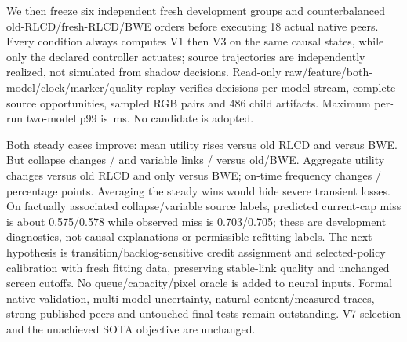 \documentclass[10pt]{article}
\begin{document}
We then freeze six independent fresh development groups and counterbalanced old-RLCD/fresh-RLCD/BWE orders before executing 18 actual native peers. Every condition always computes V1 then V3 on the same causal states, while only the declared controller actuates; source trajectories are independently realized, not simulated from shadow decisions. Read-only raw/feature/both-model/clock/marker/quality replay verifies \NativeMixedDecisions{} decisions per model stream, \NativeMixedRequests{} complete source opportunities, \NativeMixedPairs{} sampled RGB pairs and 486 child artifacts. Maximum per-run two-model p99 is \NativeMixedPolicyTail{}\,ms. No candidate is adopted.
\begin{table}[ht]
\centering

\caption{Fresh mixed-native single-model development means over six matched source/schedule groups, with common V1-then-V3 shadow compute. Generated content, same-host userspace transport and native GCC remain shared limitations; this is not promotion or representative SOTA evidence.}
\label{tab:native-mixed-v3}
\end{table}
\begin{table}[ht]
\centering\resizebox{\textwidth}{!}{}
\caption{All template-family gains and losses of fresh mixed-data RLCD. Each family has two actual source groups; positive/negative values favor/harm the candidate. Descriptive paired means, not confidence intervals or independent-model replication.}
\label{tab:native-mixed-v3-groups}
\end{table}
Both steady cases improve: mean utility rises \NativeMixedStableOldUtilityDelta{} versus old RLCD and \NativeMixedStableBweUtilityDelta{} versus BWE. But collapse changes \NativeMixedCollapseOldUtilityDelta{} / \NativeMixedCollapseBweUtilityDelta{} and variable links \NativeMixedVariableOldUtilityDelta{} / \NativeMixedVariableBweUtilityDelta{} versus old/BWE. Aggregate utility changes \NativeMixedOldUtilityDelta{} versus old RLCD and only \NativeMixedBweUtilityDelta{} versus BWE; on-time frequency changes \NativeMixedOldOntimeDelta{} / \NativeMixedBweOntimeDelta{} percentage points. Averaging the steady wins would hide severe transient losses. On factually associated collapse/variable source labels, predicted current-cap miss is about 0.575/0.578 while observed miss is 0.703/0.705; these are development diagnostics, not causal explanations or permissible refitting labels. The next hypothesis is transition/backlog-sensitive credit assignment and selected-policy calibration with fresh fitting data, preserving stable-link quality and unchanged screen cutoffs. No queue/capacity/pixel oracle is added to neural inputs. Formal native validation, multi-model uncertainty, natural content/measured traces, strong published peers and untouched final tests remain outstanding. V7 selection and the unachieved SOTA objective are unchanged.
\end{document}
